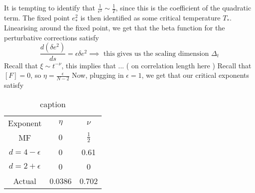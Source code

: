 It is tempting to identify that $ \frac{1}{e ^ 2 } \sim \frac{1}{T } $, since this is the 
coefficient of the quadratic term. The fixed point $ e_* ^ 2 $ is 
then identified as some critical temperature $  T_ * $. 
Linearising around the fixed point, we get that the beta 
function for the perturbative corrections satisfy 
\[
\frac{ d ( \delta e ^ 2 ) }{ ds }  = \epsilon \delta e ^  2 \implies \text{ this gives us the scaling dimension } 
\Delta _ t 
\] Recall that $ \xi \sim t ^{ - \nu } $, this implies that ... ( on correlation length here )
Recall that $ [ F ] = 0 $, so $ \eta = \frac{ \epsilon }{ N -2 }$
Now, plugging in $ \epsilon = 1 $, we get that our critical exponents 
satisfy
\begin{table}[htpb]
\centering
\caption{caption}
\label{tab:label}
\begin{tabular}{c | c c }
	Exponent & $ \eta $ & $ \nu $ \\
	MF & $ 0 $ & $ \frac{1}{2 } $ \\
	$ d = 4 - \epsilon $ & 0 & 0.61 \\
	$ d = 2 + \epsilon $ & 0 & 0 \\
	Actual & 0.0386 & 0.702 \\
\end{tabular}
\end{table}

